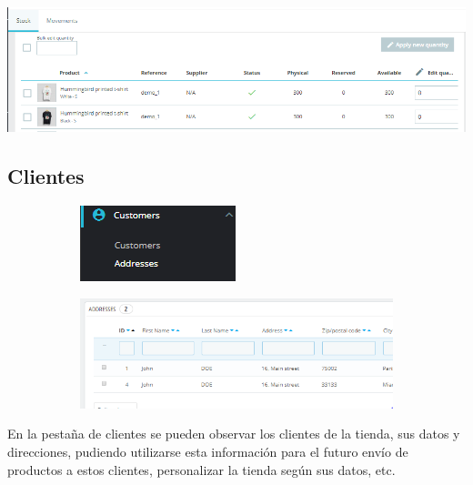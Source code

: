 \documentclass{article}
\begin{document}
\begin{center}
\includegraphics[scale=0.4]{images/stock.png}
\end{center}

\subsection{Clientes}

\begin{figure}[h!]
        \raggedright
        \begin{subfigure}[!]{0.2\textwidth} 
            \includegraphics[width=\textwidth]{images/customers.png}
        \end{subfigure}       
        \begin{subfigure}[!]{0.7\textwidth} 
            \includegraphics[width=\textwidth]{images/cliente.png}
        \end{subfigure}
    \end{figure}

En la pestaña de clientes se pueden observar los clientes de la tienda, sus datos y direcciones, pudiendo utilizarse esta información para el futuro envío de productos a estos clientes, personalizar la tienda según sus datos, etc.
\end{document}
